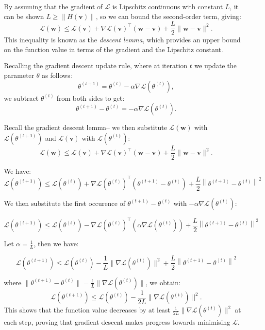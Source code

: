 By assuming that the gradient of $\mathcal{L}$ is Lipschitz continuous with constant $L$, it can be shown $L \geq \|H(\bm{v})\|$, so we can bound the second-order term, giving:
\[
    \mathcal{L}(\bm{w}) \leq \mathcal{L}(\bm{v}) + \nabla \mathcal{L}(\bm{v})^\top (\bm{w} - \bm{v}) + \frac{L}{2} \|\bm{w} - \bm{v}\|^2.
\]
This inequality is known as the \textit{descent lemma}, which provides an upper bound on the function value in terms of the gradient and the Lipschitz constant.

Recalling the gradient descent update rule, where at iteration \(t\) we update the parameter \(\theta\) as follows:
\[
    \theta^{(t+1)} = \theta^{(t)} - \alpha \nabla \mathcal{L}(\theta^{(t)}),
\]
we subtract \(\theta^{(t)}\) from both sides to get:
\[
    \theta^{(t+1)} - \theta^{(t)} = -\alpha \nabla \mathcal{L}(\theta^{(t)}).
\]

Recall the gradient descent lemma– we then substitute $\mathcal{L}(\bm{w})$ with $\mathcal{L}(\theta^{(t+1)})$ and $\mathcal{L}(\bm{v})$ with $\mathcal{L}(\theta^{(t)})$:
\[
    \mathcal{L}(\bm{w}) \leq \mathcal{L}(\bm{v}) + \nabla \mathcal{L}(\bm{v})^\top (\bm{w} - \bm{v}) + \frac{L}{2} \|\bm{w} - \bm{v}\|^2.
    \]
    
We have:
\[
    \mathcal{L}(\theta^{(t+1)})\leq\mathcal{L}(\theta^{(t)})+\nabla\mathcal{L}(\theta^{(t)})^\top(\theta^{(t+1)}-\theta^{(t)})+\frac L2\left\|\theta^{(t+1)}-\theta^{(t)}\right\|^2
\]

We then substitute the first occurence of $\theta^{(t+1)} - \theta^{(t)}$ with $-\alpha \nabla \mathcal{L}(\theta^{(t)})$:

\[
    \mathcal{L}(\theta^{(t+1)}) \leq \mathcal{L}(\theta^{(t)}) - \nabla \mathcal{L}(\theta^{(t)})^\top (\alpha \nabla \mathcal{L}(\theta^{(t)})) + \frac L2\left\|\theta^{(t+1)}-\theta^{(t)}\right\|^2
\]

Let $\alpha = \frac{1}{L}$, then we have:

\[
    \mathcal{L}(\theta^{(t+1)})\leq\mathcal{L}(\theta^{(t)})-\frac1L\|\nabla\mathcal{L}(\theta^{(t)})\|^2+\frac L2\left\|\theta^{(t+1)}-\theta^{(t)}\right\|^2
\]


where \(\|\theta^{(t+1)} - \theta^{(t)}\| = \frac{1}{L} \|\nabla \mathcal{L}(\theta^{(t)})\|\), we obtain:
\[
    \mathcal{L}(\theta^{(t+1)}) \leq \mathcal{L}(\theta^{(t)}) - \frac{1}{2L} \|\nabla \mathcal{L}(\theta^{(t)})\|^2.
\]
This shows that the function value decreases by at least \(\frac{1}{2L} \|\nabla \mathcal{L}(\theta^{(t)})\|^2\) at each step, proving that gradient descent makes progress towards minimising \(\mathcal{L}\).

